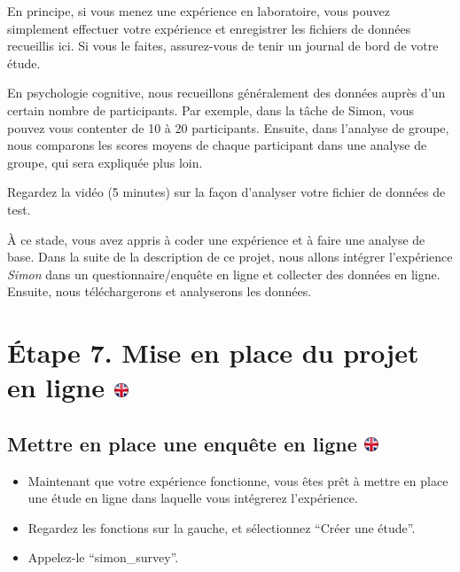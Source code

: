 \documentclass[
]{book}
\providecommand{\tightlist}{%
  \setlength{\itemsep}{0pt}\setlength{\parskip}{0pt}}
\begin{document}
En principe, si vous menez une expérience en laboratoire, vous pouvez simplement effectuer votre expérience et enregistrer les fichiers de données recueillis ici. Si vous le faites, assurez-vous de tenir un journal de bord de votre étude.

En psychologie cognitive, nous recueillons généralement des données auprès d'un certain nombre de participants. Par exemple, dans la tâche de Simon, vous pouvez vous contenter de 10 à 20 participants. Ensuite, dans l'analyse de groupe, nous comparons les scores moyens de chaque participant dans une analyse de groupe, qui sera expliquée plus loin.

Regardez la vidéo (5 minutes) sur la façon d'analyser votre fichier de données de test.

À ce stade, vous avez appris à coder une expérience et à faire une analyse de base. Dans la suite de la description de ce projet, nous allons intégrer l'expérience \emph{Simon} dans un questionnaire/enquête en ligne et collecter des données en ligne. Ensuite, nous téléchargerons et analyserons les données.

\hypertarget{uxe9tape-7.-mise-en-place-du-projet-en-ligne}{%
\section[Étape 7. Mise en place du projet en ligne ]{\texorpdfstring{Étape 7. Mise en place du projet en ligne \href{https://www.psytoolkit.org/lessons/project.html\#_step_7_setup_online_project}{\protect\includegraphics{img/ukflag.png}}}{Étape 7. Mise en place du projet en ligne }}\label{uxe9tape-7.-mise-en-place-du-projet-en-ligne}}

\hypertarget{mettre-en-place-une-enquuxeate-en-ligne}{%
\subsection[Mettre en place une enquête en ligne ]{\texorpdfstring{Mettre en place une enquête en ligne \href{https://www.psytoolkit.org/lessons/project.html\#_setup_an_online_survey}{\protect\includegraphics{img/ukflag.png}}}{Mettre en place une enquête en ligne }}\label{mettre-en-place-une-enquuxeate-en-ligne}}

\begin{itemize}
\tightlist
\item
  Maintenant que votre expérience fonctionne, vous êtes prêt à mettre en place une étude en ligne dans laquelle vous intégrerez l'expérience.
\item
  Regardez les fonctions sur la gauche, et sélectionnez ``Créer une étude''.
\item
  Appelez-le ``simon\_survey''.
\end{itemize}
\end{document}

